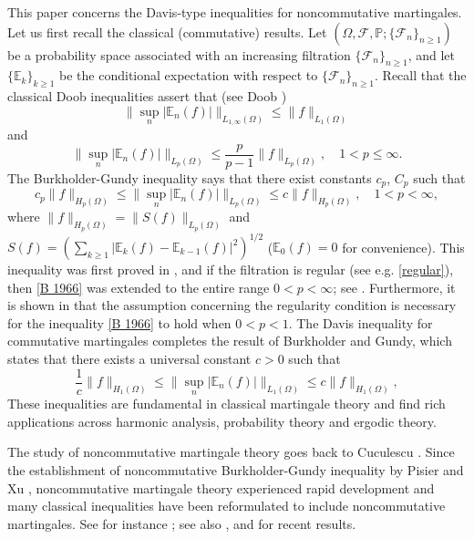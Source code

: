\documentclass[11]{amsart}
\numberwithin{equation}{section}
\begin{document}
This paper concerns  the Davis-type inequalities for noncommutative martingales. Let us first recall the  classical (commutative) results. Let $(\Omega,\mathcal{F},\mathbb{P};\{\mathcal{F}_n\}_{n\geq1})$  be a probability space associated with an increasing filtration $\{\mathcal{F}_n\}_{n\geq1}$, and let $\{\mathbb{E}_k\}_{k\geq1}$ be the conditional expectation with respect to $\{\mathcal{F}_n\}_{n\geq1}$. Recall that the classical Doob inequalities assert that (see Doob \cite{Doob1953})
\begin{equation}\label{Doob w11}
	\|\sup_n|\mathbb{E}_n(f)|\|_{L_{1,\infty}(\Omega)}\leq \|f\|_{L_1(\Omega)}
\end{equation}
and 
\begin{equation}\label{Doob spp}
	\|\sup_n|\mathbb{E}_n(f)|\|_{L_{p}(\Omega)}\leq \frac{p}{p-1}\|f\|_{L_p(\Omega)},\quad 1<p\leq \infty.
\end{equation}
The Burkholder-Gundy inequality says that there exist constants $c_p$, $C_p$ such that
\begin{equation}\label{B 1966}
c_p\|f\|_{H_p(\Omega)}\leq \|\sup_n|\mathbb{E}_n(f)|\|_{L_p(\Omega)}\leq c\|f\|_{H_p(\Omega)},\quad 1<p<\infty,
\end{equation}
where $\|f\|_{H_p(\Omega)}=\|S(f)\|_{L_p(\Omega)}$ and $S(f)=(\sum_{k\geq1}|\mathbb{E}_k(f)-\mathbb{E}_{k-1}(f)|^2)^{1/2}$ ($\mathbb{E}_0(f)=0$ for convenience).
This inequality was first proved in \cite[Theorem 9]{Bu1966}, and if the filtration is regular (see e.g. \eqref{regular}), then \eqref{B 1966} was extended to the entire range $0 < p < \infty$; see \cite{BG1970}. Furthermore, it is shown in \cite{BG1970} that the assumption concerning the regularity condition is necessary for the inequality \eqref{B 1966} to hold when $0<p<1$.
The Davis inequality \cite{Da1970} for commutative martingales completes the result of Burkholder and Gundy, which states that there exists a universal constant $c>0$ such that 
\begin{equation}\label{Davis 1970}
	\frac{1}{c}\|f\|_{H_1(\Omega)}\leq \|\sup_n|\mathbb{E}_n(f)|\|_{L_1(\Omega)}\leq c\|f\|_{H_1(\Omega)},
\end{equation}
These inequalities are fundamental in classical martingale theory and find rich applications across harmonic analysis, probability theory and ergodic theory.

The study of noncommutative martingale theory goes back to Cuculescu \cite{Cu1971}. Since the establishment of noncommutative Burkholder-Gundy inequality by Pisier and Xu \cite{PX1997}, noncommutative martingale theory experienced rapid development and many classical inequalities have been reformulated to include noncommutative martingales. See for instance \cite{Ju2002,JM2007,JX2003,JX2008,Rand2002,Rand2005,Rand2007,RWX2019}; see also \cite{JOW2018,JOW2019,JOWZ2022,JRWZ2020,JZZ2023}, \cite{CRX2023} and \cite{Ra2023} for recent results.
\end{document}
